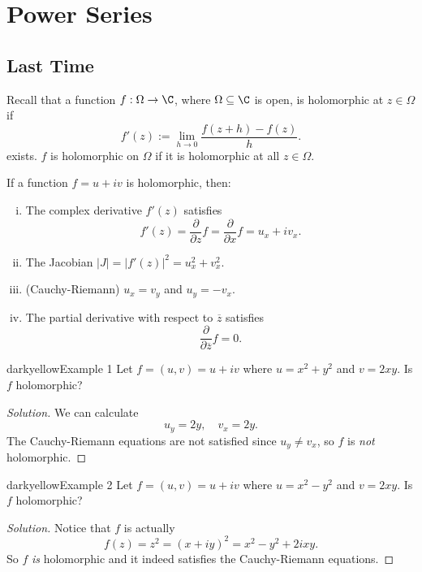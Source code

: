 \chapter{Power Series}

\section{Last Time}
Recall that a function $f : \Omega \to \C$, where
$\Omega \subseteq \C$ is open, is holomorphic
at $z \in \Omega$ if
\[
  f'(z) := \lim_{h \to 0} \frac{f(z + h) - f(z)}{h}
.\]
exists. $f$ is holomorphic on $\Omega$ if it is
holomorphic at all $z \in \Omega$.

If a function $f = u + iv$ is holomorphic, then:
\begin{enumerate}[(i).]
  \item The complex derivative $f'(z)$ satisfies
    \[f'(z) = \frac{\partial}{\partial z} f = \frac{\partial}{\partial x} f = u_x + iv_x.\]
  \item The Jacobian $\left\lvert J \right\rvert = \left\lvert f'(z) \right\rvert^2 = u_x^2 + v_x^2$.
  \item (Cauchy-Riemann) $u_x = v_y$ and $u_y = -v_x$.
  \item The partial derivative with respect to $\overline{z}$ satisfies
    \[\frac{\partial}{\partial \overline{z}} f = 0.\]
\end{enumerate}

\begin{mybox}{darkyellow}{Example 1}
  Let $f = (u, v) = u + iv$ where $u = x^2 + y^2$ and
  $v = 2xy$. Is $f$ holomorphic?
\end{mybox}

\begin{proof}[Solution]
  We can calculate
  \[u_y = 2y, \quad v_x = 2y.\]
  The Cauchy-Riemann equations are not satisfied since
  $u_y \ne v_x$, so $f$ is \textit{not} holomorphic.
\end{proof}

\begin{mybox}{darkyellow}{Example 2}
  Let $f = (u, v) = u + iv$ where $u = x^2 - y^2$ and
  $v = 2xy$. Is $f$ holomorphic?
\end{mybox}

\begin{proof}[Solution]
  Notice that $f$ is actually
  \[f(z) = z^2 = (x + iy)^2 = x^2 - y^2 + 2ixy.\]
  So $f$ \textit{is} holomorphic and it indeed satisfies
  the Cauchy-Riemann equations.
\end{proof}
